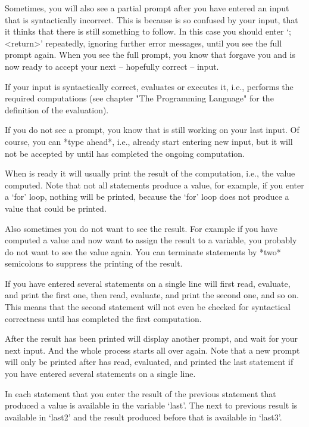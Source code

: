 Sometimes, you will also see a partial prompt after you have entered an
input that is syntactically incorrect. This is because {\GAP} is so
confused by your input, that it thinks that there is still something to
follow. In this case you should enter `;<return>' repeatedly, ignoring
further error messages, until you see the full prompt again. When you
see the full prompt, you know that {\GAP} forgave you and is now ready to
accept your next -- hopefully correct -- input.

If your input is syntactically correct, {\GAP} evaluates or executes it,
i.e., performs the required computations (see chapter "The Programming
Language" for the definition of the evaluation).

If you do not see a prompt, you know that {\GAP} is still working on your
last input. Of course, you can *type ahead*, i.e., already start
entering new input, but it will not be accepted by {\GAP} until {\GAP}
has completed the ongoing computation.

When {\GAP} is ready it will usually print the result of the computation,
i.e., the value computed. Note that not all statements produce a value,
for example, if you enter a `for' loop, nothing will be printed, because
the `for' loop does not produce a value that could be printed.

Also sometimes you do not want to see the result. For example if you
have computed a value and now want to assign the result to a variable,
you probably do not want to see the value again. You can terminate
statements by *two* semicolons to suppress the printing of the result.

If you have entered several statements on a single line {\GAP} will first
read, evaluate, and print the first one, then read, evaluate, and print
the second one, and so on. This means that the second statement will not
even be checked for syntactical correctness until {\GAP} has completed
the first computation.

After the result has been printed {\GAP} will display another prompt, and
wait for your next input. And the whole process starts all over again.
Note that a new prompt will only be printed after {\GAP} has read,
evaluated, and printed the last statement if you have entered several
statements on a single line.

In each statement that you enter the result of the previous statement
that produced a value is available in the variable `last'. The next to
previous result is available in `last2' and the result produced before
that is available in `last3'.

